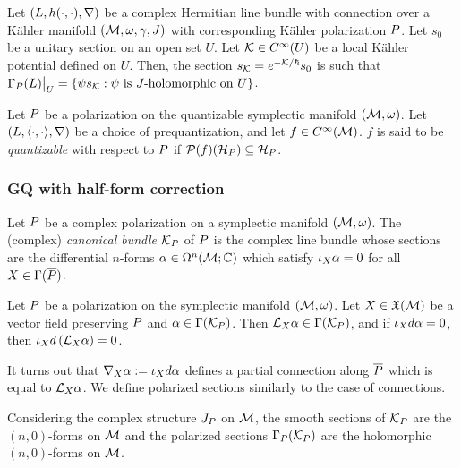 \documentclass[notas.tex]{subfiles} 				%
\begin{document}
\begin{prop} \label{prop_polarized_holo_sections}
	Let $(L, h(\cdot,\cdot), \nabla)$ be a complex Hermitian line bundle with connection over a Kähler manifold $(\mathcal{M}, \omega, \gamma, J)$ with corresponding Kähler polarization $P$. Let $s_0$ be a unitary section on an open set $U$. Let $\mathcal{K} \in C^\infty(U)$ be a local Kähler potential defined on $U$. Then, the section $s_{\mathcal{K}} = e^{-\mathcal{K}/\hbar} s_0$ is such that $\Gamma_P(L)\big|_U = \{\psi s_{\mathcal{K}}: \psi \text{ is $J$-holomorphic on $U$}\}$.
\end{prop}
\begin{defn}\label{def_observable_quantizable}
	Let $P$ be a polarization on the quantizable symplectic manifold $(\mathcal{M}, \omega)$. Let $(L, \langle \cdot,\cdot \rangle, \nabla)$ be a choice of prequantization, and let $f \in C^\infty(\mathcal{M})$. $f$ is said to be \emph{quantizable} with respect to $P$ if $\mathcal{P}(f)(\mathcal{H}_P) \subseteq \mathcal{H}_P$.
\end{defn}

\subsubsection{GQ with half-form correction} \label{sec_gq_with_hf}

\begin{defn}
	Let $P$ be a complex polarization on a symplectic manifold $(\mathcal{M}, \omega)$. The (complex) \emph{canonical bundle} $\mathcal{K}_P$ of $P$ is the complex line bundle whose sections are the differential $n$-forms $\alpha \in \Omega^n(\mathcal{M}; \mathbb{C})$ which satisfy $\iota_{X}\alpha = 0$ for all $X \in \Gamma(\overline {P})$.
\end{defn}
\begin{prop} \label{prop_lied_preservation}
	Let $P$ be a polarization on the symplectic manifold $(\mathcal{M},\omega)$. Let $X \in \mathfrak{X}(\mathcal{M})$ be a vector field preserving $P$ and $\alpha \in \Gamma(\mathcal{K}_P)$. Then $\mathcal{L}_{X}\alpha \in \Gamma(\mathcal{K}_P)$, and if $\iota_{X}d \alpha = 0$, then $\iota_{X}d \left( \mathcal{L}_{X} \alpha \right) = 0$.
\end{prop}
It turns out that $\nabla_{X}\alpha := \iota_{X}d \alpha$ defines a partial connection along $\overline {P}$ which is equal to $\mathcal{L}_{X} \alpha$. We define polarized sections similarly to the case of connections.
\begin{rem}
	Considering the complex structure $J_P$ on $\mathcal{M}$, the smooth sections of $\mathcal{K}_P$ are the $(n,0)$-forms on $\mathcal{M}$ and the polarized sections $\Gamma_P(\mathcal{K}_P)$ are the holomorphic $(n,0)$-forms on $\mathcal{M}$.
\end{rem}
\end{document}
